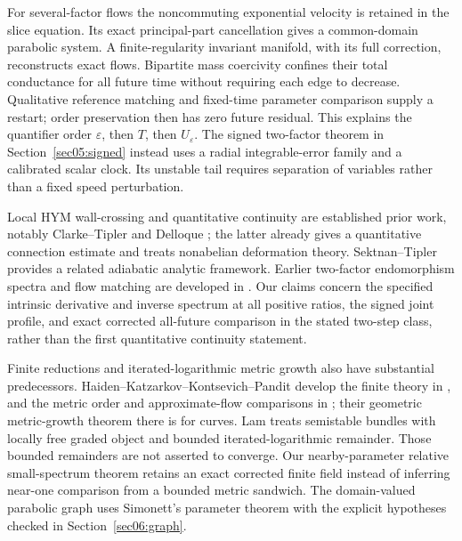 \documentclass[11pt]{amsart}
\theoremstyle{definition}
\theoremstyle{remark}
\begin{document}
For several-factor flows the noncommuting exponential velocity is
retained in the slice equation. Its exact principal-part cancellation
gives a common-domain parabolic system. A finite-regularity invariant
manifold, with its full correction, reconstructs exact flows.
Bipartite mass coercivity confines their total conductance for all
future time without requiring each edge to decrease. Qualitative
reference matching and fixed-time parameter comparison supply a
restart; order preservation then has zero future residual. This
explains the quantifier order \(\varepsilon\), then \(T\), then
\(U_\varepsilon\). The signed two-factor theorem in
Section~\ref{sec05:signed} instead uses a radial integrable-error
family and a calibrated scalar clock. Its unstable tail requires
separation of variables rather than a fixed speed perturbation.

Local HYM wall-crossing and quantitative continuity are established
prior work, notably Clarke--Tipler \cite{clarketipler2024} and
Delloque \cite{delloque2025}; the latter already gives a quantitative
connection estimate and treats nonabelian deformation theory.
Sektnan--Tipler \cite{sektnantipler2024} provides a related
adiabatic analytic framework. Earlier two-factor endomorphism
spectra and flow matching are developed in
\cite{wuebben2026walls,wuebben2026flow}. Our claims concern the
specified intrinsic derivative and inverse spectrum at all positive
ratios, the signed joint profile, and exact corrected all-future
comparison in the stated two-step class, rather than the first
quantitative continuity statement.

Finite reductions and iterated-logarithmic metric growth also have
substantial predecessors. Haiden--Katzarkov--Kontsevich--Pandit
develop the finite theory in \cite{hkkp2023}, and the metric order
and approximate-flow comparisons in \cite[\S4.2]{hkkp2018}; their
geometric metric-growth theorem there is for curves. Lam
\cite{lam2026} treats semistable bundles with locally free graded
object and bounded iterated-logarithmic remainder. Those bounded
remainders are not asserted to converge. Our nearby-parameter
relative small-spectrum theorem retains an exact corrected finite
field instead of inferring near-one comparison from a bounded
metric sandwich. The domain-valued parabolic graph uses Simonett's
parameter theorem \cite{simonett1994} with the explicit hypotheses
checked in Section~\ref{sec06:graph}.

\end{document}
